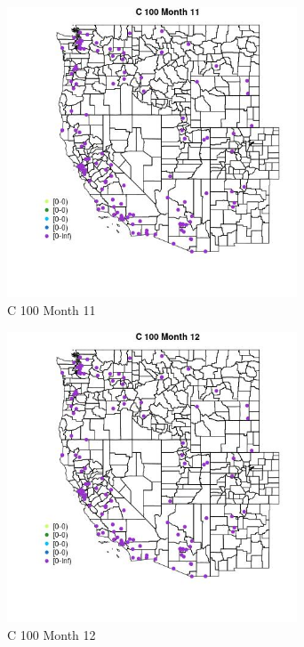 \begin{figure} 
\centering  
\includegraphics[width=0.77\textwidth]{Code_Outputs/Report_ML_input_PM25_Step4_part_e_de_duplicated_aves_MapObsMo11C_100.jpg} 
\caption{\label{fig:Report_ML_input_PM25_Step4_part_e_de_duplicated_avesMapObsMo11C_100}C 100 Month 11} 
\end{figure} 
 

\begin{figure} 
\centering  
\includegraphics[width=0.77\textwidth]{Code_Outputs/Report_ML_input_PM25_Step4_part_e_de_duplicated_aves_MapObsMo12C_100.jpg} 
\caption{\label{fig:Report_ML_input_PM25_Step4_part_e_de_duplicated_avesMapObsMo12C_100}C 100 Month 12} 
\end{figure} 
 

